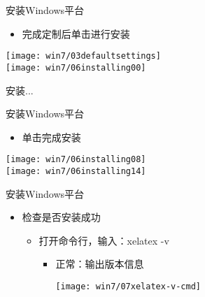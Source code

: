 \documentclass[fontset = none, t]{ctexbeamer}
\begin{document}
\begin{frame}{安装\tl}{Windows平台}
  \begin{spacing}{1.0}
    \begin{itemize}
    \item 完成定制后单击进行\tl 安装
    \end{itemize}  
    \begin{center}
      \texttt{[image: win7/03defaultsettings]}\\
      \texttt{[image: win7/06installing00]}
    \end{center}
  \end{spacing}
\end{frame}

\begin{frame}
  安装...
\end{frame}

\begin{frame}{安装\tl}{Windows平台}
  \begin{spacing}{1.0}
    \begin{itemize}
    \item 单击完成\tl 安装
    \end{itemize}  
    \begin{center}
      \texttt{[image: win7/06installing08]}\\
      \texttt{[image: win7/06installing14]}
    \end{center}
  \end{spacing}
\end{frame}

\begin{frame}{安装\tl}{Windows平台}
  \begin{spacing}{1.5}
    \begin{itemize}
    \item 检查\tl 是否安装成功
      \begin{itemize}
      \item 打开命令行，输入：xelatex -v
        \begin{itemize}
        \item 正常：输出\alert{版本}信息
          \begin{center}
            \texttt{[image: win7/07xelatex-v-cmd]}
          \end{center}
        \end{itemize}
      \end{itemize}
    \end{itemize}
  \end{spacing}         
\end{frame}
\end{document}
